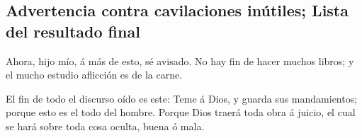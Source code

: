 \hypertarget{advertencia-contra-cavilaciones-inuxfatiles-lista-del-resultado-final}{%
\subsection{Advertencia contra cavilaciones inútiles; Lista del
resultado
final}\label{advertencia-contra-cavilaciones-inuxfatiles-lista-del-resultado-final}}

 Ahora, hijo mío, á más de esto, sé avisado. No hay fin de
hacer muchos libros; y el mucho estudio aflicción es de la carne.

 El fin de todo el discurso oído es este: Teme á Dios, y
guarda sus mandamientos; porque esto es el todo del hombre.
 Porque Dios traerá toda obra á juicio, el cual se hará
sobre toda cosa oculta, buena ó mala.
